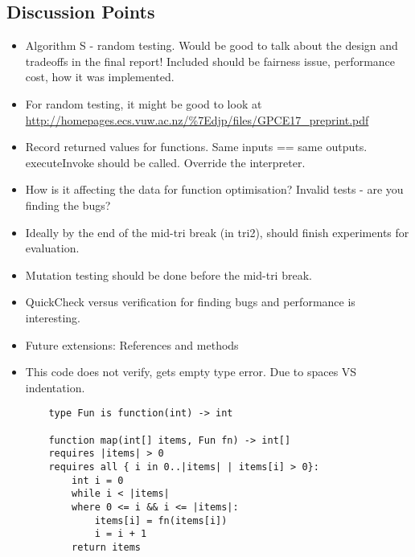 \documentclass[]{article}
\begin{document}
\subsection{Discussion Points}
\begin{itemize}
	\item Algorithm S - random testing. Would be good to talk about the design and tradeoffs in the final report! Included should be fairness issue, performance cost, how it was implemented. 
	\item For random testing, it might be good to look at \url{http://homepages.ecs.vuw.ac.nz/%7Edjp/files/GPCE17_preprint.pdf}
	\item Record returned values for functions. Same inputs == same outputs. executeInvoke should be called. 
	Override the interpreter.
	\item How is it affecting the data for function optimisation? Invalid tests - are you finding the bugs?
	\item Ideally by the end of the mid-tri break (in tri2), should finish experiments for evaluation.
	\item Mutation testing should be done before the mid-tri break.
	\item QuickCheck versus verification for finding bugs and performance is interesting.
	\item Future extensions: References and methods
	\item This code does not verify, gets empty type error.
	Due to spaces VS indentation.
	
	\begin{verbatim}
	type Fun is function(int) -> int
	
	function map(int[] items, Fun fn) -> int[]
	requires |items| > 0 
	requires all { i in 0..|items| | items[i] > 0}:
	    int i = 0
	    while i < |items|
	    where 0 <= i && i <= |items|:
	        items[i] = fn(items[i])
	        i = i + 1
		return items
	\end{verbatim}
\end{itemize}
\end{document}
